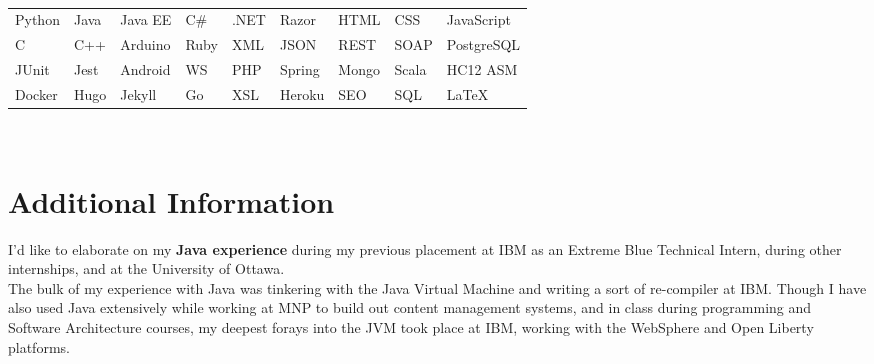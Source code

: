 \documentclass[]{rcf_cv}
\begin{document}
	\textcolor[rgb]{0.99,0.99,0.99}{
	\scalebox{.001}{ %
	Address: 1205 - 180 Lees Ave Ottawa, Ontario K1S 5J6, 
	City: Ottawa, Province: Ontario ON,
	Name: Ryan Fleck,
	Email: Ryan.Fleck@protonmail.com,
	GitHub: RyanFleck, https://github.com/RyanFleck/
	Stack Overflow: https://stackoverflow.com/users/9899022/ryan-fleck
	Version Control: Git, Github, Microsoft TFS.
	Automated testing with python and selenium.			
	Innovative, Daring, Computer Science, Computer Engineering
	Experience programmer. Computer programmer, 
	Full-stack, 
	Mobile Phone: +1 (613) 501 4043
	Phone: 6135014043
	University: University of Ottawa, 
	Degree Type: Bachelor's Degree, 
	Major: Computer Engineering,	 
	Start: September 2015
	End: April 2021
	Concurrent Java programming.
	Asynchronous JavaScript programming.
	SCRUM, AGILE, technical innovator.			
	} %
	}\\
	\begin{tabular}{l l l l l l l l l}
		Python & Java & Java EE & C\# & .NET & Razor & HTML & CSS & JavaScript\\
		
		C & C++ & Arduino & Ruby & XML & JSON & REST & SOAP & PostgreSQL\\
		
		JUnit & Jest & Android & WS & PHP & Spring & Mongo & Scala &  HC12 ASM\\
		
		Docker & Hugo & Jekyll & Go & XSL & Heroku & SEO & SQL & \LaTeX
		
	\end{tabular} \\
	
	
	\section{Additional Information}

	
	I'd like to elaborate on my \textbf{Java experience} during
	my previous placement at IBM as an Extreme Blue Technical Intern, during other internships, and at the University of Ottawa. \\
	
	The bulk of my experience with Java was tinkering with the Java Virtual Machine and writing
	a sort of re-compiler at IBM. Though I have also used Java extensively while working at MNP
	to build out content management systems, and in class during programming and Software Architecture
	courses, my deepest forays into the JVM took place at IBM, 
	working with the WebSphere and Open Liberty platforms. \\
	
\end{document}
